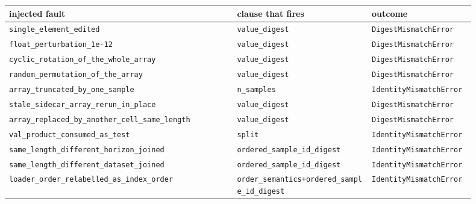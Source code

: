 \footnotesize
\begin{tabular}{@{}p{0.44\linewidth}p{0.26\linewidth}p{0.20\linewidth}@{}}
\toprule
injected fault & clause that fires & outcome \\
\midrule
\texttt{single\_\allowbreak{}element\_\allowbreak{}edited} & \texttt{value\_\allowbreak{}digest} & \texttt{DigestMismatchError} \\
\texttt{float\_\allowbreak{}perturbation\_\allowbreak{}1e-12} & \texttt{value\_\allowbreak{}digest} & \texttt{DigestMismatchError} \\
\texttt{cyclic\_\allowbreak{}rotation\_\allowbreak{}of\_\allowbreak{}the\_\allowbreak{}whole\_\allowbreak{}array} & \texttt{value\_\allowbreak{}digest} & \texttt{DigestMismatchError} \\
\texttt{random\_\allowbreak{}permutation\_\allowbreak{}of\_\allowbreak{}the\_\allowbreak{}array} & \texttt{value\_\allowbreak{}digest} & \texttt{DigestMismatchError} \\
\texttt{array\_\allowbreak{}truncated\_\allowbreak{}by\_\allowbreak{}one\_\allowbreak{}sample} & \texttt{n\_\allowbreak{}samples} & \texttt{IdentityMismatchError} \\
\texttt{stale\_\allowbreak{}sidecar\_\allowbreak{}array\_\allowbreak{}rerun\_\allowbreak{}in\_\allowbreak{}place} & \texttt{value\_\allowbreak{}digest} & \texttt{DigestMismatchError} \\
\texttt{array\_\allowbreak{}replaced\_\allowbreak{}by\_\allowbreak{}another\_\allowbreak{}cell\_\allowbreak{}same\_\allowbreak{}length} & \texttt{value\_\allowbreak{}digest} & \texttt{DigestMismatchError} \\
\texttt{val\_\allowbreak{}product\_\allowbreak{}consumed\_\allowbreak{}as\_\allowbreak{}test} & \texttt{split} & \texttt{IdentityMismatchError} \\
\texttt{same\_\allowbreak{}length\_\allowbreak{}different\_\allowbreak{}horizon\_\allowbreak{}joined} & \texttt{ordered\_\allowbreak{}sample\_\allowbreak{}id\_\allowbreak{}digest} & \texttt{IdentityMismatchError} \\
\texttt{same\_\allowbreak{}length\_\allowbreak{}different\_\allowbreak{}dataset\_\allowbreak{}joined} & \texttt{ordered\_\allowbreak{}sample\_\allowbreak{}id\_\allowbreak{}digest} & \texttt{IdentityMismatchError} \\
\texttt{loader\_\allowbreak{}order\_\allowbreak{}relabelled\_\allowbreak{}as\_\allowbreak{}index\_\allowbreak{}order} & \texttt{order\_\allowbreak{}semantics+\allowbreak{}ordered\_\allowbreak{}sample\_\allowbreak{}id\_\allowbreak{}digest} & \texttt{IdentityMismatchError} \\

\end{tabular}
